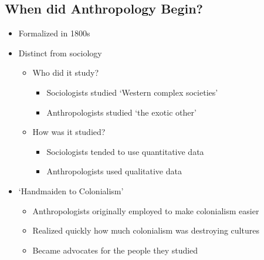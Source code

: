 \documentclass[a4paper]{article}
\begin{document}
\subsection{When did Anthropology Begin?}
\begin{itemize}
  \item Formalized in 1800s
  \item Distinct from sociology \begin{itemize}
    \item Who did it study? \begin{itemize}
      \item Sociologists studied `Western complex societies'
      \item Anthropologists studied `the exotic other'
    \end{itemize}
    \item How was it studied? \begin{itemize}
      \item Sociologists tended to use quantitative data
      \item Anthropologists used qualitative data
    \end{itemize}
  \end{itemize}
  \item `Handmaiden to Colonialism' \begin{itemize}
    \item Anthropologists originally employed to make colonialism easier
    \item Realized quickly how much colonialism was destroying cultures
    \item Became advocates for the people they studied
  \end{itemize}
\end{itemize}
\end{document}
